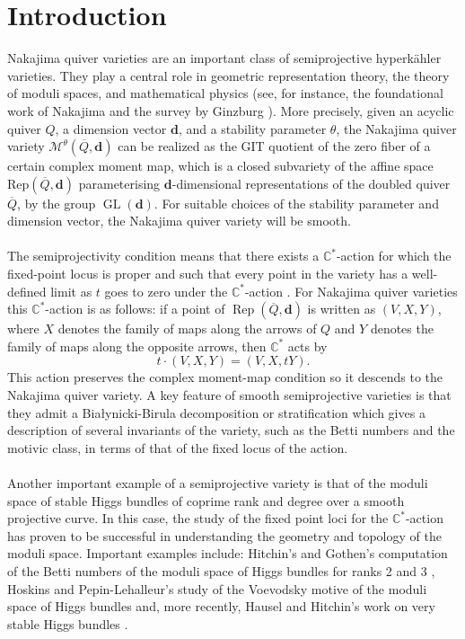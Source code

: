 \documentclass{amsart}
\theoremstyle{plain}
\numberwithin{equation}{section}
\theoremstyle{definition}
\theoremstyle{remark}
\begin{document}
	\section{Introduction}
	\noindent Nakajima quiver varieties are an important class of semiprojective hyperkähler varieties. They play a central role in geometric representation theory, the theory of moduli spaces, and mathematical physics (see, for instance, the foundational work of Nakajima \cite{Nakajima} and the survey by Ginzburg \cite{GinzburgSurvey}). More precisely, given an acyclic quiver $Q$, a dimension vector $\mathbf d$, and a stability parameter $\theta$, the Nakajima quiver variety $\mathcal M^\theta(\overline Q,\mathbf d)$ can be realized as the GIT quotient of the zero fiber of a certain complex moment map, which is a closed subvariety of the affine space $\text{Rep}(\overline{Q},\mathbf{d})$ parameterising $\mathbf{d}$-dimensional representations of the doubled quiver $\overline{Q}$, by the group $\operatorname{GL}(\mathbf d)$. For suitable choices of the stability parameter and dimension vector, the Nakajima quiver variety will be smooth. 
	\\
	\\
	The semiprojectivity condition means that there exists a $\mathbb{C}^*$-action for which the fixed-point locus is proper and such that every point in the variety has a well-defined limit as $t$ goes to zero under the $\mathbb{C}^*$-action \cite{HauselRodriguezVillegas}. For Nakajima quiver varieties this $\mathbb{C}^*$-action is as follows:  if a point of $\operatorname{Rep}(\overline Q,\mathbf d)$ is written as $(V,X,Y)$, where $X$ denotes the family of maps along the arrows of $Q$ and $Y$ denotes the family of maps along the opposite arrows, then $\mathbb C^*$ acts by
	$$
	t\cdot (V,X,Y)=(V,X,tY).
	$$
	This action preserves the complex moment-map condition so it descends to the Nakajima quiver variety. A key feature of smooth semiprojective varieties is that they admit a Bia\l ynicki-Birula decomposition or stratification which gives a description of several invariants of the variety, such as the Betti numbers and  the motivic class, in terms of that of the fixed locus of the action.  
	\\
	\\
	Another important example of a semiprojective variety is that of the moduli space of stable Higgs bundles of coprime rank and degree over a smooth projective curve. In this case, the study of the fixed point loci for the $\mathbb{C}^*$-action has proven to be successful in understanding the geometry and topology of the moduli space. Important examples include: Hitchin's and Gothen's computation of the Betti numbers of the moduli space of Higgs bundles for ranks 2 and 3 \cite{GothenBettiNumbers}\cite{HitchinSelfDuality}, Hoskins and Pepin-Lehalleur's study of the Voevodsky motive of the moduli space of Higgs bundles \cite{HoskinsVoevodskyMotive} and, more recently, Hausel and Hitchin's work on very stable Higgs bundles \cite{HauselHitchin}.  
\end{document}
